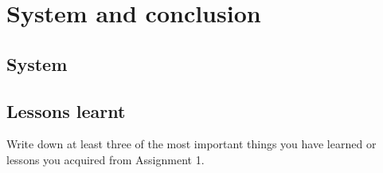 \chapter{System and conclusion}
\vspace{-5mm}
\section{System}


\section{Lessons learnt}
Write down at least three of the most important things you have learned or lessons you acquired from Assignment 1.
